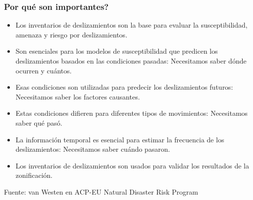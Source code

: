 \documentclass[12pt]{beamer}
\begin{document}
\begin{frame}
\frametitle{Por qué son importantes?}
\scriptsize{
\begin{itemize}
\item Los inventarios de deslizamientos son la base para evaluar la susceptibilidad, amenaza y riesgo por deslizamientos.\\
\vspace{0.3cm}
\item Son esenciales para los modelos de susceptibilidad que predicen los deslizamientos basados en las condiciones pasadas: Necesitamos saber dónde ocurren y cuántos.\\
\vspace{0.3cm}
\item Esas condiciones son utilizadas para predecir los deslizamientos futuros: Necesitamos saber los factores causantes.
\item Estas condiciones difieren para diferentes tipos de movimientos: Necesitamos saber qué pasó.\\
\vspace{0.3cm}
\item La información temporal es esencial para estimar la frecuencia de los deslizamientos: Necesitamos saber cuándo pasaron.\\
\vspace{0.3cm}
\item Los inventarios de deslizamientos son usados para validar los resultados de la zonificación.
\end{itemize}
}
\vspace{1cm}
\tiny{Fuente: van Westen en ACP-EU Natural Disaster Risk Program }
\end{frame}
\end{document}
